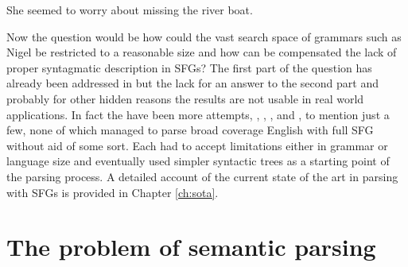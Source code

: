 
\begin{exe}
    \ex\label{ex:glance2} She seemed to worry about missing the river boat.
\end{exe}



Now the question would be how could the vast search space of grammars such as Nigel be restricted to a reasonable size and how can be compensated the lack of proper syntagmatic description in SFGs? The first part of the question has already been addressed in \citet{ODonnell1993} but the lack for an answer to the second part and probably for other hidden reasons the results are not usable in real world applications. In fact the have been more attempts, \citet{Kasper1988}, \citet{Kay1985}, \citet{ODonoghue1991a}, \citet{ODonnell1993} and \citet{Day2007}, to mention just a few, none of which managed to parse broad coverage English with full SFG without aid of some sort. Each had to accept limitations either in grammar or language size and eventually used simpler syntactic trees as a starting point of the parsing process. A detailed account of the current state of the art in parsing with SFGs is provided in Chapter \ref{ch:sota}. 



\section{The problem of semantic parsing}
\label{sec:semantic-parsing-problem}


